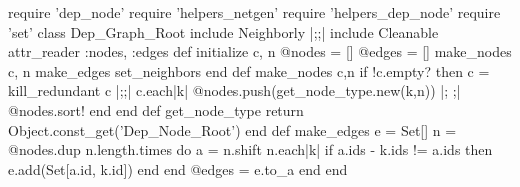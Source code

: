 \begin{rubyblock}
require 'dep_node'
require 'helpers_netgen'
require 'helpers_dep_node'
require 'set'
class Dep_Graph_Root
  include Neighborly |;\label{code:dep-graph-includes};|
  include Cleanable
  attr_reader :nodes, :edges
  def initialize c, n
    @nodes = []
    @edges = []
    make_nodes c, n
    make_edges
    set_neighbors
  end
  def make_nodes c,n
    if !c.empty? then
      c = kill_redundant c |;\label{code:dep-graph-kill};|
      c.each{|k| @nodes.push(get_node_type.new(k,n))} |;\label{code:dep-graph-push-node} ;|
      @nodes.sort!
    end
  end
  def get_node_type
    return Object.const_get('Dep_Node_Root')
  end
  def make_edges 
    e = Set[]
    n = @nodes.dup
    n.length.times do
      a = n.shift
      n.each{|k| if a.ids - k.ids != a.ids then e.add(Set[a.id, k.id]) end}
    end
    @edges = e.to_a
  end  
end
\end{rubyblock}
